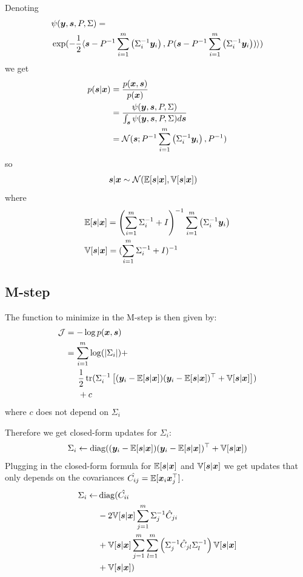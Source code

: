 Denoting
\begin{align*}
&\psi(\boldsymbol{y}, \boldsymbol{s}, P, \Sigma) = \\& \exp(-\frac12 \langle \boldsymbol{s}  - P^{-1}  \sum_{i=1}^m \left(\Sigma_i^{-1} \boldsymbol{y}_i \right) , P (\boldsymbol{s} - P^{-1} \sum_{i=1}^m \left(\Sigma_i^{-1} \boldsymbol{y}_i \right)) \rangle)
\end{align*}
 we get
 \begin{align}
     p(\boldsymbol{s} | \boldsymbol{x}) &= \frac{p(\boldsymbol{x}, \boldsymbol{s})}{p(\boldsymbol{x})} \\
                   &= \frac{\psi(\boldsymbol{y}, \boldsymbol{s}, P, \Sigma)}{
                     \int_{\boldsymbol{s}} \psi(\boldsymbol{y}, \boldsymbol{s}, P, \Sigma) d \boldsymbol{s}} \\
     &= \mathcal{N}(\boldsymbol{s}; P^{-1} \sum_{i=1}^m \left(\Sigma_i^{-1} \boldsymbol{y}_i \right), P^{-1})
 \end{align}
so 
\begin{align}
  &\boldsymbol{s}|\boldsymbol{x} \sim \mathcal{N}( \mathbb{E}[\boldsymbol{s}|\boldsymbol{x}], \mathbb{V}[\boldsymbol{s} | \boldsymbol{x}])
\end{align}
where
\begin{align}
	&\mathbb{E}[\boldsymbol{s}|\boldsymbol{x}]= \left(\sum_{i=1}^m \Sigma_i^{-1}  + I \right)^{-1}  \sum_{i=1}^m \left(\Sigma_i^{-1} \boldsymbol{y}_i \right)  \\
  &\mathbb{V}[\boldsymbol{s}|\boldsymbol{x}]= (\sum_{i=1}^m \Sigma_i^{-1}  + I)^{-1} 
\end{align}

\subsection{M-step}
The function to minimize in the M-step is then given by:
\begin{align}
  \mathcal{J} &= -\log p(\boldsymbol{x}, \boldsymbol{s}) \\
        &= \sum_{i=1}^m \log(|\Sigma_i|) + \\ &\enspace \enspace \enspace \frac12 \mathop{\mathrm{tr}}(\Sigma_i^{-1} \left[(\boldsymbol{y}_i - \mathbb{E}[\boldsymbol{s} | \boldsymbol{x}]) (\boldsymbol{y}_i - \mathbb{E}[\boldsymbol{s} | \boldsymbol{x}])^{\top}+ \mathbb{V}[\boldsymbol{s} | \boldsymbol{x}]\right]) \\ &\enspace \enspace \enspace + c
\end{align}
where $c$ does not depend on $\Sigma_i$

Therefore we get closed-form updates for $\Sigma_i$: 
\begin{align}
\Sigma_i \leftarrow  \operatorname*{diag}((\boldsymbol{y}_i - \mathbb{E}[\boldsymbol{s} | \boldsymbol{x}]) (\boldsymbol{y}_i - \mathbb{E}[\boldsymbol{s} | \boldsymbol{x}])^{\top}+ \mathbb{V}[\boldsymbol{s} | \boldsymbol{x}])
\end{align}
Plugging in the closed-form formula for $\mathbb{E}[\boldsymbol{s}|\boldsymbol{x}]$ and $\mathbb{V}[\boldsymbol{s}|\boldsymbol{x}]$ we get updates that only depends on the covariances $\hat{C_{ij}} = \mathbb{E}[\boldsymbol{x}_i \boldsymbol{x}_j^{\top}]$.
\begin{align*}
\Sigma_i \leftarrow &\operatorname*{diag}(\hat{C_{ii}} \\&- 2 \mathbb{V}[\boldsymbol{s} | \boldsymbol{x}]  \sum_{j=1}^m \Sigma_j^{-1} \hat{C}_{ji}  \\&+ \mathbb{V}[\boldsymbol{s} | \boldsymbol{x}]  \sum_{j = 1}^m \sum_{l = 1}^m \left(\Sigma_j^{-1} \hat{C}_{jl} \Sigma_l^{-1} \right) \mathbb{V}[\boldsymbol{s} | \boldsymbol{x}] \\&+ \mathbb{V}[\boldsymbol{s} | \boldsymbol{x}])
\end{align*}


